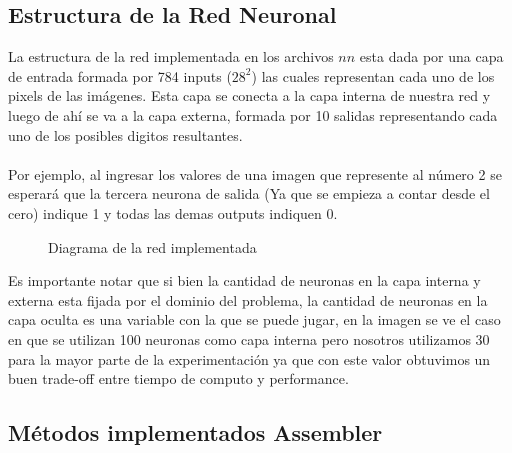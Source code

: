 \subsection{Estructura de la Red Neuronal}

La estructura de la red implementada en los archivos $nn$ esta dada por una capa de entrada formada por 784 inputs ($28^2$) las cuales representan cada uno de los pixels de las imágenes. Esta capa se conecta a la capa interna de nuestra red y luego de ahí se va a la capa externa, formada por 10 salidas representando cada uno de los posibles digitos resultantes.
\\
\\
Por ejemplo, al ingresar los valores de una imagen que represente al número 2 se esperará que la tercera neurona de salida (Ya que se empieza a contar desde el cero) indique 1 y todas las demas outputs indiquen 0.

\begin{figure}[H]
\centering
\caption{Diagrama de la red implementada}
\centering
\end{figure}

Es importante notar que si bien la cantidad de neuronas en la capa interna y externa esta fijada por el dominio del problema, la cantidad de neuronas en la capa oculta es una variable con la que se puede jugar, en la imagen se ve el caso en que se utilizan 100 neuronas como capa interna pero nosotros utilizamos 30 para la mayor parte de la experimentación ya que con este valor obtuvimos un buen trade-off entre tiempo de computo y performance.

\subsection{Métodos implementados Assembler}

